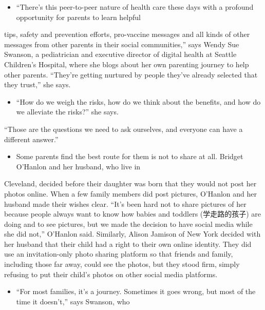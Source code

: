 \documentclass[UTF8,11pt]{ctexart}
\begin{document}
\begin{itemize}[leftmargin=2em,itemsep=.2em,topsep=.4em]\item[J.] “There’s this peer-to-peer nature of health care these days with a profound opportunity for parents to learn helpful
\end{itemize}

tips, safety and prevention efforts, pro-vaccine messages and all kinds of other messages from other parents in their social communities,” says Wendy Sue Swanson, a pediatrician and executive director of digital health at Seattle Children’s Hospital, where she blogs about her own parenting journey to help other parents. “They’re getting nurtured by people they’ve already selected that they trust,” she says.


\begin{itemize}[leftmargin=2em,itemsep=.2em,topsep=.4em]\item[K.] “How do we weigh the risks, how do we think about the benefits, and how do we alleviate the risks?” she says.
\end{itemize}

“Those are the questions we need to ask ourselves, and everyone can have a different answer.”


\begin{itemize}[leftmargin=2em,itemsep=.2em,topsep=.4em]\item[L.] Some parents find the best route for them is not to share at all. Bridget O’Hanlon and her husband, who live in
\end{itemize}

Cleveland, decided before their daughter was born that they would not post her photos online. When a few family members did post pictures, O’Hanlon and her husband made their wishes clear. “It’s been hard not to share pictures of her because people always want to know how babies and toddlers (学走路的孩子) are doing and to see pictures, but we made the decision to have social media while she did not,” O’Hanlon said. Similarly, Alison Jamison of New York decided with her husband that their child had a right to their own online identity. They did use an invitation-only photo sharing platform so that friends and family, including those far away, could see the photos, but they stood firm, simply refusing to put their child’s photos on other social media platforms.


\begin{itemize}[leftmargin=2em,itemsep=.2em,topsep=.4em]\item[M.] “For most families, it’s a journey. Sometimes it goes wrong, but most of the time it doesn’t,” says Swanson, who
\end{itemize}
\end{document}
